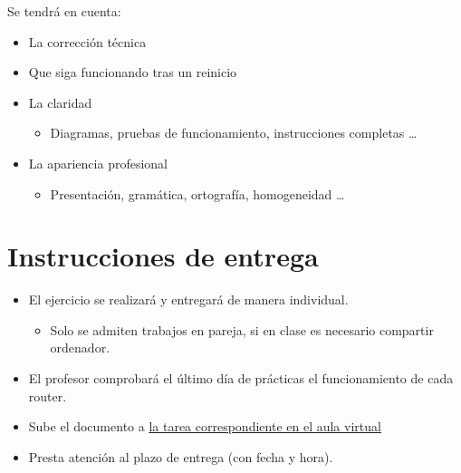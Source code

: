 \documentclass[a4paper]{article}
\begin{document}
Se tendrá en cuenta:
\begin{itemize}
\item La corrección técnica
\item Que siga funcionando tras un reinicio
\item La claridad
\begin{itemize}
\item Diagramas, pruebas de funcionamiento, instrucciones completas \ldots
\end{itemize}
\item La apariencia profesional
\begin{itemize}
\item Presentación, gramática, ortografía, homogeneidad \ldots
\end{itemize}
\end{itemize}



\section{Instrucciones de entrega}
\label{sec:org0000012}
\begin{itemize}
\item El ejercicio se realizará y entregará de manera individual.
\begin{itemize}
\item Solo se admiten trabajos en pareja, si en clase es necesario compartir ordenador.
\end{itemize}
\item El profesor comprobará el último día de prácticas el funcionamiento de cada router.
\item Sube el documento a \href{https://aulavirtual3.educa.madrid.org/ies.alonsodeavellan.alcala/course/view.php?id=189}{la tarea correspondiente en el aula virtual}
\item Presta atención al plazo de entrega (con fecha y hora).
\end{itemize}
\end{document}
